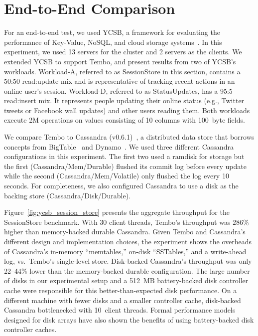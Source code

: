 \section{End-to-End Comparison}


For an end-to-end test, we used YCSB, a framework for evaluating the
performance of Key-Value, NoSQL, and cloud storage systems~\citep{Cooper10}.
In this experiment, we used 13 servers for the cluster and 2 servers
as the clients.  We extended YCSB to support Tembo, and present
results from two of YCSB's workloads.  Workload-A, referred to as
SessionStore in this section, contains a 50:50 read:update mix and is
representative of tracking recent actions in an online user's session.
Workload-D, referred to as StatusUpdates, has a 95:5 read:insert mix.
It represents people updating their online status (e.g., Twitter
tweets or Facebook wall updates) and other users reading them.  Both
workloads execute 2M operations on values consisting of 10 columns
with 100~byte fields.

We compare Tembo to Cassandra (v0.6.1)~\citep{Lakshman10}, a
distributed data store that borrows concepts from
BigTable~\citep{Chang08} and Dynamo~\citep{DeCandia07}.  We used three
different Cassandra configurations in this experiment.  The first two
used a ramdisk for storage but the first (Cassandra/Mem/Durable)
flushed its commit log before every update while the second
(Cassandra/Mem/Volatile) only flushed the log every 10 seconds.  For
completeness, we also configured Cassandra to use a disk as the
backing store (Cassandra/Disk/Durable).

Figure~\ref{fig:ycsb_session_store} presents the aggregate throughput
for the SessionStore benchmark. With 30 client threads, Tembo's
throughput was $286$\% higher than memory-backed durable Cassandra.
Given Tembo and Cassandra's different design and implementation
choices, the experiment shows the overheads of Cassandra's in-memory
``memtables,'' on-disk ``SSTables,'' and a write-ahead log,
vs.\ Tembo's single-level store.  Disk-backed Cassandra's throughput
was only 22--44\% lower than the memory-backed durable configuration.
The large number of disks in our experimental setup and a 512~MB
battery-backed disk controller cache were responsible for this
better-than-expected disk performance.  On a different machine with
fewer disks and a smaller controller cache, disk-backed Cassandra
bottlenecked with 10~client threads. Formal performance 
models~\cite{Varki04} designed for disk arrays have also shown the 
benefits of using battery-backed disk controller caches.

